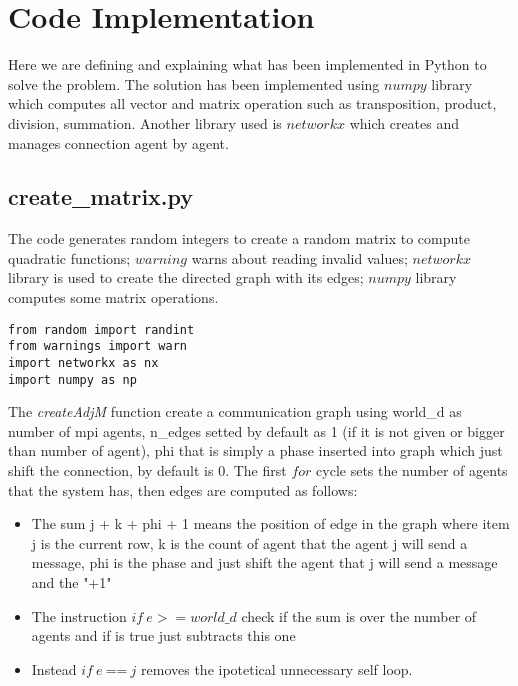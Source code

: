 \documentclass[a4paper,11pt,oneside]{book}
\begin{document}
\section {Code Implementation} \label{Sec1.2}

Here we are defining and explaining what has been implemented in Python to solve the problem. The solution has been implemented using 
$numpy$ library which computes all vector and matrix operation such as transposition, product, division, summation. Another library used is
$networkx$ which creates and manages connection agent by agent.\\

\subsection {create\_matrix.py}

The code generates random integers to create a random matrix to
compute quadratic functions; $warning$ warns about reading invalid values; $networkx$ library is used to create the directed graph
with its edges; $numpy$ library computes some matrix operations.
\begin{lstlisting}
from random import randint
from warnings import warn
import networkx as nx
import numpy as np
\end{lstlisting}


The \textit{createAdjM} function create a communication graph using world\_d as number of
mpi agents, n\_edges  setted by default as 1 (if it is not given or
bigger than number of agent), phi that is simply a phase inserted into
graph which just shift the connection, by default is 0. The first $for$
cycle sets the number of agents that the system has, then edges are
computed as follows:
\begin{itemize}
    \item The sum j + k + phi + 1 means the position of edge in the
    graph where item j is the current row, k is the count of agent 
    that the agent j will send a message, phi is the phase and just
    shift the agent that j will send a message and the "+1" 

    \item The instruction $ if \ e >= world\_d $  check if the sum is over the number of
    agents and if is true just subtracts this one

    \item Instead $ if \ e \ $==$ \  j $ removes the ipotetical unnecessary self loop.
\end{itemize}
\end{document}
